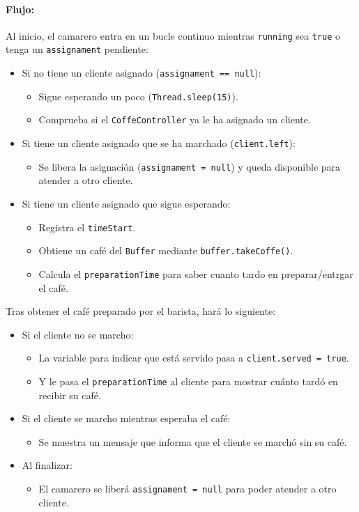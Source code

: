 \documentclass[a4paper,12pt]{report}
\begin{document}
\paragraph{Flujo:}
Al inicio, el camarero entra en un bucle continuo mientras \texttt{running} sea \texttt{true} o tenga un \texttt{assignament} pendiente:
\begin{itemize}
  \item Si no tiene un cliente asignado (\texttt{assignament == null}):
  \begin{itemize}
    \item Sigue esperando un poco (\texttt{Thread.sleep(15)}).
    \item Comprueba si el \texttt{CoffeController} ya le ha asignado un cliente.
  \end{itemize}
  \item Si tiene un cliente asignado que se ha marchado (\texttt{client.left}):
  \begin{itemize}
    \item Se libera la asignación (\texttt{assignament = null}) y queda disponible para atender a otro cliente.
  \end{itemize}
  \item Si tiene un cliente asignado que sigue esperando:
  \begin{itemize}
    \item Registra el \texttt{timeStart}.
    \item Obtiene un café del \texttt{Buffer} mediante \texttt{buffer.takeCoffe()}.
    \item Calcula el \texttt{preparationTime} para saber cuanto tardo en preparar/entrgar el café.
  \end{itemize}
\end{itemize}

\noindent Tras obtener el café preparado por el barista, hará lo siguiente:
\begin{itemize}
  \item Si el cliente no se marcho:
  \begin{itemize}
    \item La variable para indicar que está servido pasa a \texttt{client.served = true}.
    \item Y le pasa el \texttt{preparationTime} al cliente para mostrar cuánto tardó en recibir su café.
  \end{itemize}
  \item Si el cliente se marcho mientras esperaba el café:
  \begin{itemize}
    \item Se muestra un mensaje que informa que el cliente se marchó sin su café.
  \end{itemize}
  \item Al finalizar:
  \begin{itemize}
    \item El camarero se liberá \texttt{assignament = null} para poder atender a otro cliente.
  \end{itemize}
\end{itemize}
\end{document}
